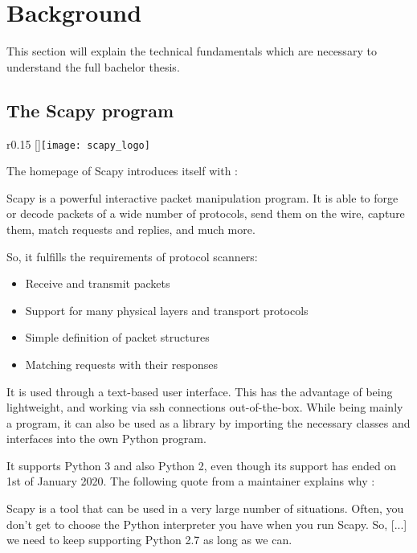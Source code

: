 \chapter{Background}

This section will explain the technical fundamentals which are necessary to understand the full bachelor thesis.

\section{The Scapy program}
\label{sec:scapy}

\begin{wrapfigure}{r}{0.15\textwidth}
    \raisebox{0pt}[\dimexpr{}\baselineskip\relax]{\texttt{[image: scapy\_logo]}}
\end{wrapfigure}

The homepage of Scapy introduces itself with \cite{scapy}:
\begin{displayquote}
Scapy is a powerful interactive packet manipulation program. It is able to forge or decode packets of a wide number of protocols, send them on the wire, capture them, match requests and replies, and much more.
\end{displayquote}

So, it fulfills the requirements of protocol scanners:
\begin{itemize}
    \item Receive and transmit packets
    \item Support for many physical layers and transport protocols
    \item Simple definition of packet structures
    \item Matching requests with their responses
\end{itemize} 

It is used through a text-based user interface. This has the advantage of being lightweight, and working via ssh connections out-of-the-box. While being mainly a program, it can also be used as a library by importing the necessary classes and interfaces into the own Python program.

It supports Python 3 and also Python 2, even though its support has ended on 1st of January 2020. The following quote from a maintainer explains why \cite{scapy-py2}:

\begin{displayquote}
    Scapy is a tool that can be used in a very large number of situations. Often, you don't get to choose the Python interpreter you have when you run Scapy. So, [...] we need to keep supporting Python 2.7 as long as we can.
\end{displayquote}


